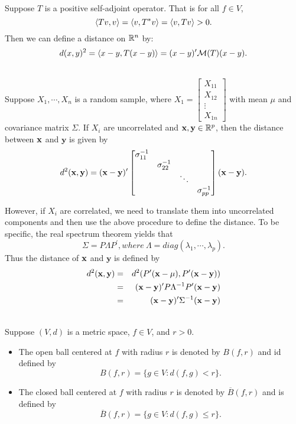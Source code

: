 \documentclass[12pt]{book}
\begin{document}
\begin{example}[Distance on $\R^n$] \ \\
Suppose $T$ is a positive self-adjoint operator. That is for all $f \in V$, 
$$
{\langle Tv,v\rangle} = {\langle v,T^* v\rangle} = {\langle v,Tv\rangle}>0.
$$
Then we can define a distance on $\R^n$ by:
$$
d(x,y)^2 = {\langle x-y,T(x-y)\rangle}=(x-y)^\prime \mathcal{M}(T) (x-y).
$$
\end{example}
\begin{example} \ \\ 
Suppose $X_1,\cdots,X_n$ is a random sample, where $X_1 = \begin{bmatrix}
	X_{11} \\
	X_{12} \\
	\vdots \\
	X_{1n}
\end{bmatrix}$ with mean $\mu$ and covariance matrix $\Sigma$. If $X_i$ are uncorrelated and $\mathbf{x},\mathbf{y}\in \mathbb{R}^p$, then the distance between $\mathbf{x}$ and $\mathbf{y}$ is given by
$$
d^2(\mathbf{x},\mathbf{y}) = (\mathbf{x}-\mathbf{y})^\prime \begin{bmatrix}
	\sigma_{11}^{-1} & & & \\
	 & \sigma_{22}^{-1} & & \\
	 & & \ddots & \\
	 & & & \sigma_{pp}^{-1}
\end{bmatrix} (\mathbf{x}-\mathbf{y}).
$$
\end{example}
However, if $X_i$ are correlated, we need to translate them into uncorrelated components and then use the above procedure to define the distance. To be specific, the real spectrum theorem yields that
$$
\Sigma = P\Lambda P^\prime , where \ \Lambda  = diag(\lambda_1,\cdots,\lambda_p).
$$
Thus the distance of $\mathbf{x}$ and $\mathbf{y}$ is defined by
\begin{eqnarray*}
d^2(\mathbf{x},\mathbf{y}) & = &d^2(P^\prime(\mathbf{x}-\mu),P^\prime (\mathbf{x}-\mathbf{y})) \\
&=& (\mathbf{x}-\mathbf{y})^\prime P \Lambda^{-1}P^\prime(\mathbf{x}-\mathbf{y}) \\
&=& (\mathbf{x}-\mathbf{y})^\prime \Sigma^{-1} (\mathbf{x} - \mathbf{y})
\end{eqnarray*}











\begin{definition} \ \\
Suppose $(V,d)$ is a metric space, $f \in V$, and $r >0$.
\begin{itemize}
	\item The open ball centered at $f$ with radius $r$ is denoted by $B(f,r)$ and id defined by
	$$
	B(f,r) = \{g\in V: d(f,g) < r\}.
	$$
	\item The closed ball centered at $f$ with radius $r$ is denoted by $\overline{B}(f,r)$ and is defined by
	$$
	\overline{B}(f,r) = \{g\in V: d(f,g) \leq r\}.
	$$
\end{itemize}
\end{definition}
\end{document}
